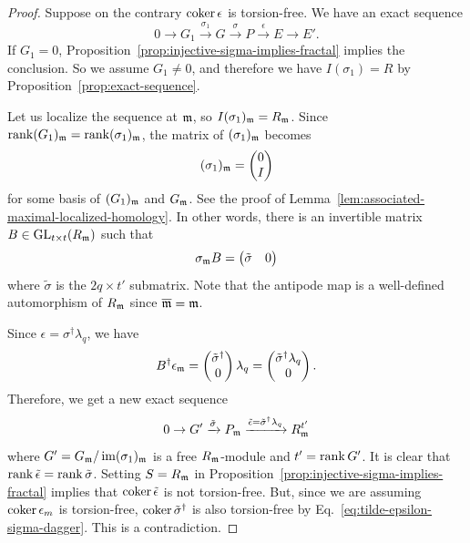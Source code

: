 \begin{proof}
Suppose on the contrary $\mathop{\mathrm{coker}}\nolimits \epsilon$ is torsion-free.
We have an exact sequence
\[
 0 \to G_1 \xrightarrow{\sigma_1} G \xrightarrow{\sigma} P \xrightarrow{\epsilon} E \to E'.
\]
If $G_1 = 0$, Proposition~\ref{prop:injective-sigma-implies-fractal} implies the conclusion.
So we assume $G_1 \ne 0$, and therefore we have $I(\sigma_1) = R$ by Proposition~\ref{prop:exact-sequence}.

Let us localize the sequence at $\mathfrak{m}$, so $I(\sigma_1)_{\mathfrak{m}} = R_{\mathfrak{m}}$.
Since $\mathop{\mathrm{rank}}\nolimits (G_1)_{\mathfrak{m}} = \mathop{\mathrm{rank}}\nolimits (\sigma_1)_{\mathfrak{m}}$, the matrix of $(\sigma_1)_{\mathfrak{m}}$ becomes
\[
 (\sigma_1)_{\mathfrak{m}} =
\begin{pmatrix}
 0 \\
 I
\end{pmatrix}
\]
for some basis of $(G_1)_{\mathfrak{m}}$ and $G_{\mathfrak{m}}$. See the proof of 
Lemma~\ref{lem:associated-maximal-localized-homology}.
In other words, there is an invertible matrix $B \in \mathrm{GL}_{ t \times t}( R_{\mathfrak{m}} )$ such that
\[
 \sigma_{\mathfrak{m}} B = 
\begin{pmatrix}
 \tilde \sigma & 0
\end{pmatrix}
\]
where $\tilde \sigma$ is the $2q \times t'$ submatrix.
Note that the antipode map is a well-defined automorphism of $R_{\mathfrak{m}}$
since $\overline {\mathfrak{m}} = \mathfrak{m}$.

Since $\epsilon = \sigma^\dagger \lambda_q$, we have
\begin{equation}
 B^\dagger \epsilon_{\mathfrak{m}} = 
\begin{pmatrix}
 \tilde \sigma^\dagger \\
 0
\end{pmatrix} \lambda_q
=
\begin{pmatrix}
 \tilde \sigma^\dagger \lambda_q \\
 0
\end{pmatrix} .
\label{eq:tilde-epsilon-sigma-dagger}
\end{equation}
Therefore, we get a new exact sequence
\[
   0 \to G' \xrightarrow{\tilde \sigma} P_{\mathfrak{m}} \xrightarrow{\tilde \epsilon = \tilde \sigma^\dagger \lambda_q} R_{\mathfrak{m}}^{t'}
\]
where $G' = G_{\mathfrak{m}} / \mathop{\mathrm{im}}\nolimits (\sigma_1)_{\mathfrak{m}}$ is a free $R_{\mathfrak{m}}$-module and $t' = \mathop{\mathrm{rank}}\nolimits G'$.
It is clear that 
$\mathop{\mathrm{rank}}\nolimits \tilde \epsilon = \mathop{\mathrm{rank}}\nolimits \tilde \sigma$.
Setting $S = R_{\mathfrak{m}}$ in Proposition~\ref{prop:injective-sigma-implies-fractal} implies that
$\mathop{\mathrm{coker}}\nolimits \tilde \epsilon$ is not torsion-free.
But, since we are assuming $\mathop{\mathrm{coker}}\nolimits \epsilon_m$ is torsion-free,
$\mathop{\mathrm{coker}}\nolimits \tilde \sigma^\dagger$ is also torsion-free by Eq.~\eqref{eq:tilde-epsilon-sigma-dagger}.
This is a contradiction.
\end{proof}



